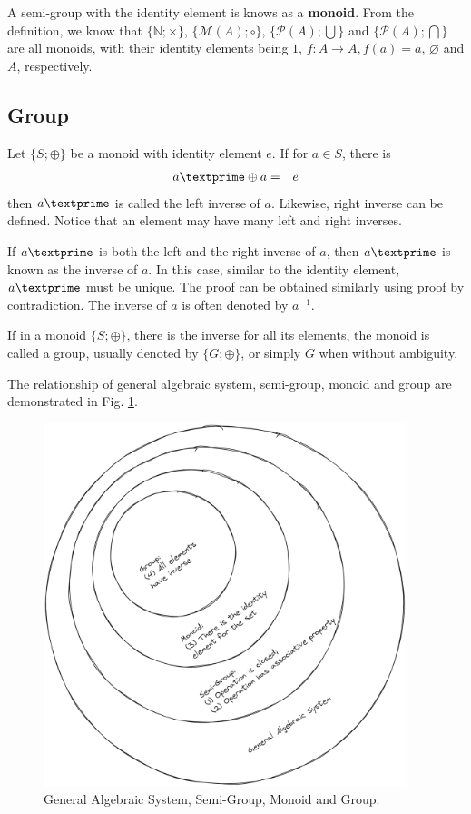 A semi-group with the identity element is knows as a \textbf{monoid}. From the definition, we know that $\{\mathbb{N}; \times\}$, $\{\mathcal{M}(A); \circ\}$, $\{\mathcal{P}(A); \bigcup\}$ and $\{\mathcal{P}(A); \bigcap\}$ are all monoids, with their identity elements being $1$, $f: A\rightarrow A, f(a)=a$, $\varnothing$ and $A$, respectively.

\subsection{Group}

Let $\{S; \oplus\}$ be a monoid with identity element $e$. If for $a\in S$, there is
\begin{eqnarray}
	a\textprime \oplus a &=& e \nonumber
\end{eqnarray}
then $a\textprime$ is called the left inverse of $a$. Likewise, right inverse can be defined. Notice that an element may have many left and right inverses.

If $a\textprime$ is both the left and the right inverse of $a$, then $a\textprime$ is known as the inverse of $a$. In this case, similar to the identity element, $a\textprime$ must be unique. The proof can be obtained similarly using proof by contradiction. The inverse of $a$ is often denoted by $a^{-1}$.

If in a monoid $\{S; \oplus\}$, there is the inverse for all its elements, the monoid is called a group, usually denoted by $\{G; \oplus\}$, or simply $G$ when without ambiguity.

The relationship of general algebraic system, semi-group, monoid and group are demonstrated in Fig. \ref{fig:group_definition}.
\begin{figure}[htbp]
	\centering
	\includegraphics[width=300pt]{chapters/abstract-algebra-basics/figures/group_definition.png}
	\caption{General Algebraic System, Semi-Group, Monoid and Group.} \label{fig:group_definition}
\end{figure}

